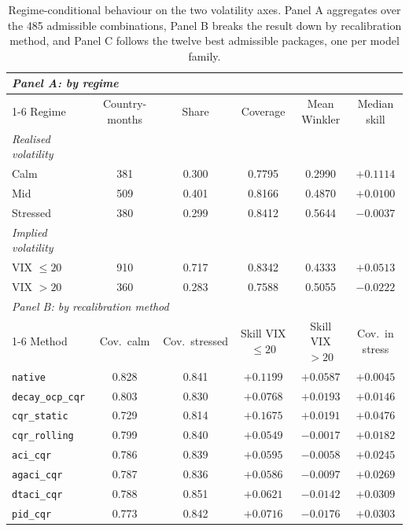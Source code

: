 \begin{table}[t]
\centering
\caption{Regime-conditional behaviour on the two volatility axes. Panel A
         aggregates over the 485 admissible combinations, Panel B breaks the result
         down by recalibration method, and Panel C follows the twelve best
         admissible packages, one per model family.}
\label{tab:res_regime}
\small
\begin{tabular}{lccccc}
\toprule
\multicolumn{6}{l}{\textit{Panel A: by regime}}\\
\cmidrule(lr){1-6}
Regime & Country-months & Share & Coverage & Mean Winkler & Median skill \\
\midrule
\textit{Realised volatility} \\
\quad Calm     & 381 & 0.300 & 0.7795 & 0.2990 & $+0.1114$ \\
\quad Mid      & 509 & 0.401 & 0.8166 & 0.4870 & $+0.0100$ \\
\quad Stressed & 380 & 0.299 & 0.8412 & 0.5644 & $-0.0037$ \\
\addlinespace
\textit{Implied volatility} \\
\quad VIX $\leq 20$ & 910 & 0.717 & 0.8342 & 0.4333 & $+0.0513$ \\
\quad VIX $> 20$    & 360 & 0.283 & 0.7588 & 0.5055 & $-0.0222$ \\
\midrule
\multicolumn{6}{l}{\textit{Panel B: by recalibration method}}\\
\cmidrule(lr){1-6}
Method & Cov.\ calm & Cov.\ stressed & Skill VIX $\leq 20$ & Skill VIX $> 20$ & Cov.\ in stress \\
\midrule
\texttt{native}         & 0.828 & 0.841 & $+0.1199$ & $+0.0587$ & $+0.0045$ \\
\texttt{decay\_ocp\_cqr}& 0.803 & 0.830 & $+0.0768$ & $+0.0193$ & $+0.0146$ \\
\texttt{cqr\_static}    & 0.729 & 0.814 & $+0.1675$ & $+0.0191$ & $+0.0476$ \\
\texttt{cqr\_rolling}   & 0.799 & 0.840 & $+0.0549$ & $-0.0017$ & $+0.0182$ \\
\texttt{aci\_cqr}       & 0.786 & 0.839 & $+0.0595$ & $-0.0058$ & $+0.0245$ \\
\texttt{agaci\_cqr}     & 0.787 & 0.836 & $+0.0586$ & $-0.0097$ & $+0.0269$ \\
\texttt{dtaci\_cqr}     & 0.788 & 0.851 & $+0.0621$ & $-0.0142$ & $+0.0309$ \\
\texttt{pid\_cqr}       & 0.773 & 0.842 & $+0.0716$ & $-0.0176$ & $+0.0303$ \\

\end{tabular}
\end{table}
